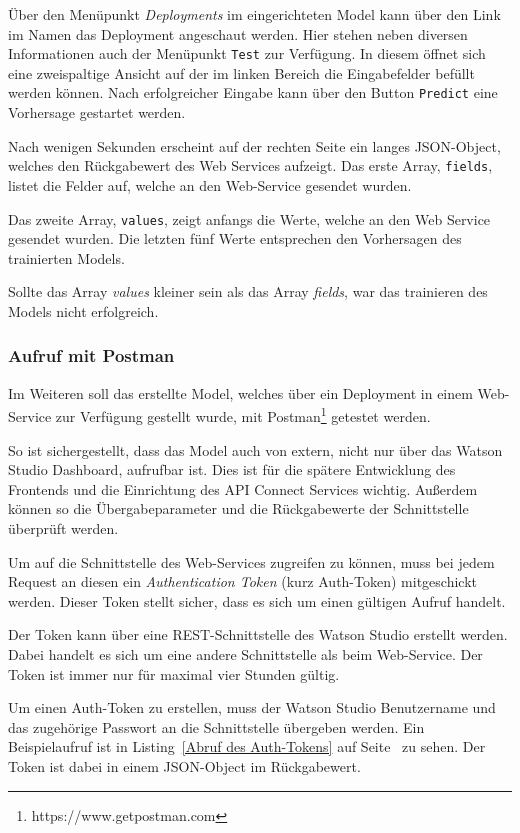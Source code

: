 Über den Menüpunkt \textit{Deployments} im eingerichteten Model kann über den Link im Namen das Deployment angeschaut
werden. Hier stehen neben diversen Informationen auch der Menüpunkt \texttt{Test} zur Verfügung. In diesem öffnet sich
eine zweispaltige Ansicht auf der im linken Bereich die Eingabefelder befüllt werden können. Nach erfolgreicher Eingabe
kann über den Button \texttt{Predict} eine Vorhersage gestartet werden.

Nach wenigen Sekunden erscheint auf der rechten Seite ein langes JSON-Object, welches den Rückgabewert des Web Services
aufzeigt. Das erste Array, \texttt{fields}, listet die Felder auf, welche an den Web-Service gesendet wurden.

Das zweite Array, \texttt{values}, zeigt anfangs die Werte, welche an den Web Service gesendet wurden. Die letzten fünf
Werte entsprechen den Vorhersagen des trainierten Models.

Sollte das Array \textit{values} kleiner sein als das Array \textit{fields}, war das trainieren des Models nicht
erfolgreich.

\subsubsection{Aufruf mit Postman}
\label{subsec:Aufruf mit Postman}
Im Weiteren soll das erstellte Model, welches über ein Deployment in einem Web-Service zur Verfügung gestellt wurde,
mit Postman\footnote{https://www.getpostman.com} getestet werden.

So ist sichergestellt, dass das Model auch von extern, nicht nur über das Watson Studio Dashboard, aufrufbar ist.
Dies ist für die spätere Entwicklung des Frontends und die Einrichtung des API Connect Services wichtig. Außerdem können
so die Übergabeparameter und die Rückgabewerte der Schnittstelle überprüft werden.

Um auf die Schnittstelle des Web-Services zugreifen zu können, muss bei jedem Request an diesen ein
\textit{Authentication Token} (kurz Auth-Token) mitgeschickt werden. Dieser Token stellt sicher, dass es sich um einen
gültigen Aufruf handelt.

Der Token kann über eine REST-Schnittstelle des Watson Studio erstellt werden. Dabei handelt es sich um eine andere
Schnittstelle als beim Web-Service. Der Token ist immer nur für maximal vier Stunden gültig.

Um einen Auth-Token zu erstellen, muss der Watson Studio Benutzername und das zugehörige Passwort an die Schnittstelle
übergeben werden. Ein Beispielaufruf ist in Listing~\ref{Abruf des Auth-Tokens} auf Seite~\pageref{Abruf des Auth-Tokens}
zu sehen. Der Token ist dabei in einem JSON-Object im Rückgabewert.

